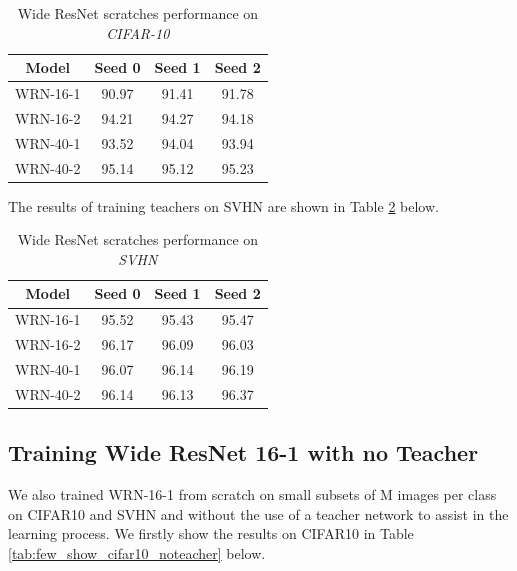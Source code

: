 \begin{table}[!h]
    \centering
    \begin{tabular}{c|ccc}
    \toprule
    \toprule
         \textbf{Model} & \textbf{Seed 0} & \textbf{Seed 1} & \textbf{Seed 2} \\
         \midrule
         WRN-16-1 & 90.97 & 91.41 & 91.78 \\
         WRN-16-2 & 94.21 & 94.27 & 94.18 \\
         WRN-40-1 & 93.52 & 94.04 & 93.94 \\
         WRN-40-2 & 95.14 & 95.12 & 95.23 \\
         \bottomrule 
         \bottomrule 
    \end{tabular}
    \vspace{0.25cm}
    \caption{Wide ResNet scratches performance on \textit{CIFAR-10}}
    \label{tab:scratch_cifar_10}
\end{table}

The results of training teachers on SVHN are shown in Table \ref{tab:scratch_svhn_10} below.  

\begin{table}[!h]
    \centering
    \begin{tabular}{c|ccc}
    \toprule
    \toprule
         \textbf{Model} & \textbf{Seed 0} & \textbf{Seed 1} & \textbf{Seed 2} \\
         \midrule
         WRN-16-1 & 95.52 & 95.43 & 95.47 \\
         WRN-16-2 & 96.17 & 96.09 & 96.03 \\
         WRN-40-1 & 96.07 & 96.14 & 96.19 \\
         WRN-40-2 & 96.14 & 96.13 & 96.37 \\
         \bottomrule
         \bottomrule
    \end{tabular}
    \vspace{0.25cm}
    \caption{Wide ResNet scratches performance on \textit{SVHN}}
    \label{tab:scratch_svhn_10}
\end{table}

\subsection{Training Wide ResNet 16-1 with no Teacher}

We also trained WRN-16-1 from scratch on small subsets of M images per class on CIFAR10 and SVHN and without the use of a teacher network to assist in the learning process. We firstly show the results on CIFAR10 in Table \ref{tab:few_show_cifar10_noteacher} below.

